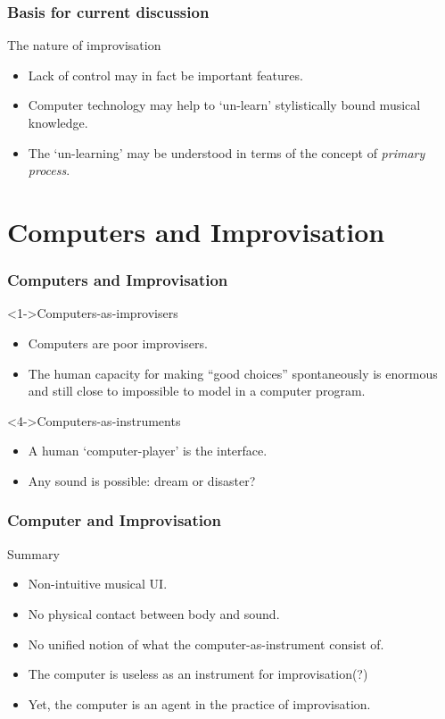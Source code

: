 \documentclass{beamer}
\begin{document}
\begin{frame}
  \frametitle{Basis for current discussion}
  \begin{block}{The nature of improvisation}
    \begin{itemize}
    \item<1-> Lack of control may in fact be important features.
    \item<2-> Computer technology may help to `un-learn' stylistically bound musical knowledge.
    \item<3-> The `un-learning' may be understood in terms of the concept of \emph{primary process}.
    \end{itemize}
  \end{block}
\end{frame}

\section{Computers and Improvisation}

\begin{frame}
  \frametitle{Computers and Improvisation}
  \begin{block}<1->{Computers-as-improvisers}
    \begin{itemize}
    \item<2-> Computers are poor improvisers.
    \item<3-> The human capacity for making ``good choices'' spontaneously is enormous
      and still close to impossible to model in a computer program.
    \end{itemize}
  \end{block}
  \begin{block}<4->{Computers-as-instruments}
    \begin{itemize}
    \item<5-> A human `computer-player' is the interface.
    \item<6-> Any sound is possible: dream or disaster?
    \end{itemize}
  \end{block}
\end{frame}

\begin{frame}
  \frametitle{Computer and Improvisation}
  \begin{block}{Summary}
    \begin{itemize}
    \item<1-> Non-intuitive musical UI.
    \item<2-> No physical contact between body and sound.
    \item<3-> No unified notion of what the computer-as-instrument consist of.
    \item<4-> The computer is useless as an instrument for improvisation(?)
    \item<5-| alert@5> Yet, the computer is an agent in the practice of improvisation.
    \end{itemize}
  \end{block}
\end{frame}
\end{document}
